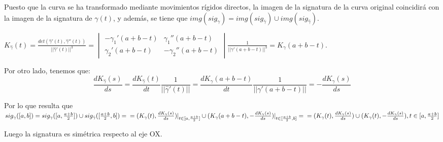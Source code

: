 \documentclass[12pt,a4paper]{article}
\begin{document}
\begin{enumerate}
  Puesto que la curva se ha transformado mediante movimientos rígidos
  directos, la imagen de la signatura de la curva original coincidirá con la
  imagen de la signatura de $\gamma(t)$, y además, se tiene que
  $img(sig_{\gamma}) = img(sig_{\bar{\gamma}}) \cup
  img(sig_{\hat{\gamma}})$.

  $K_{\hat{\gamma}}(t) = \frac{det(\hat{\gamma}'(t),
    \hat{\gamma}''(t))}{||\hat{\gamma}'(t)||^{3}} = 
  \begin{vmatrix}
    -\gamma_{1}'(a+b-t) & \gamma_{1}''(a+b-t) \\
    \gamma_{2}'(a+b-t) & -\gamma_{2}''(a+b-t) 
  \end{vmatrix} \frac{1}{||\gamma'(a+b-t)||^{3}} =K_{\gamma}(a+b-t).$

  Por otro lado, tenemos que:\\
  $$\frac{dK_{\hat{\gamma}}(s)}{ds} =
  \frac{dK_{\hat{\gamma}}(t)}{dt} \frac{1}{||\hat{\gamma}'(t)||} =
  \frac{dK_{\gamma}(a+b-t)}{dt} \frac{1}{||\gamma'(a+b-t)||} = -
  \frac{dK_\gamma(s)}{ds}$$

  Por lo que resulta que\\
  $sig_{\gamma}([a,b]) = sig_{\gamma}([a,
  \frac{a+b}{2}]) \cup sig_{\hat{\gamma}}([\frac{a+b}{2}, b]) = \\=
  (K_{\gamma}(t), \frac{dK_{\gamma}(s)}{ds})|_{t\in[a, \frac{a+b}{2}]} \cup
  (K_{\gamma}(a+b-t), - \frac{dK_{\gamma}(s)}{ds})|_{t\in[\frac{a+b}{2},
    b]} =\\= (K_{\gamma}(t), \frac{dK_{\gamma}(s)}{ds}) \cup
  (K_{\gamma}(t), - \frac{dK_{\gamma}(s)}{ds}), t\in[a, \frac{a+b}{2}]$
  
  Luego la signatura es simétrica respecto al eje OX.\\



\end{enumerate}
\end{document}
